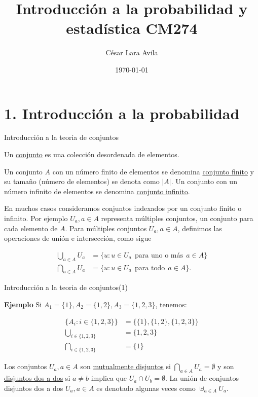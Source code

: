\documentclass{beamer}
\title{Introducci\'on a la probabilidad y estad\'istica CM274}
\date{\today}
\author{C\'esar Lara Avila}
\institute{\url{https://github.com/C-Lara}}
\begin{document}
  \maketitle
  \section{1. Introducci\'on a la probabilidad }
  
 \begin{frame}{Introducci\'on a la teoria de conjuntos}
 \small{Un \underline{conjunto} es una colecci\'on desordenada de elementos.
 	
 Un conjunto $A$ con un n\'umero finito de elementos se denomina \underline{conjunto finito} y su tama\~no (n\'umero de elementos) se denota como $\vert A \vert$. Un conjunto con un n\'umero infinito de elementos se denomina \underline{conjunto infinito}.
 	
En muchos casos consideramos conjuntos indexados por un conjunto finito o infinito. Por ejemplo $U_a, a \in A$ representa m\'ultiples conjuntos, un conjunto para cada elemento de $A$. Para m\'ultiples conjuntos $U_a, a \in A$, definimos las operaciones de uni\'on e intersecci\'on, como sigue
 	
 	\begin{align*}
 	\bigcup_{a \in A} U_a &= \{u: u \in U_a \ \ \text{para uno  o m\'as} \ \ a \in A   \} \\
 	\bigcap_{a \in A} U_a &= \{u: u \in U_a \ \ \text{para todo} \ \ a \in A   \}. 
 	\end{align*}	
 }
 \end{frame}
 
 \begin{frame}{Introducci\'on a la teoria de conjuntos(1)}
\small{ \textbf{Ejemplo}
 Si $A_1 = \{1 \}, A_2 = \{1, 2 \}, A_3 = \{1, 2, 3\}$, tenemos:
 
 \begin{align*}
 \{A_i:i \in \{1,2,3\}\} &= \{\{1\}, \{ 1, 2\}, \{1, 2, 3 \}\}\\
 \bigcup_{i \in \{1, 2, 3\}} &= \{1, 2, 3 \} \\
 \bigcap_{i \in \{1, 2, 3\}} &= \{1 \}
 \end{align*}
 
 Los conjuntos $U_a, a \in A$ son \underline{mutualmente disjuntos} si $\bigcap_{a \in A} U_a  = \emptyset$ y son \underline {disjuntos dos a dos} si $a \neq b$ implica que $U_a \cap U_b = \emptyset$. La uni\'on de conjuntos disjuntos dos a dos $U_a, a \in A$ es denotado algunas veces como $\uplus_{a \in A}U_a$.	
 	}
 \end{frame}
 
\end{document}
